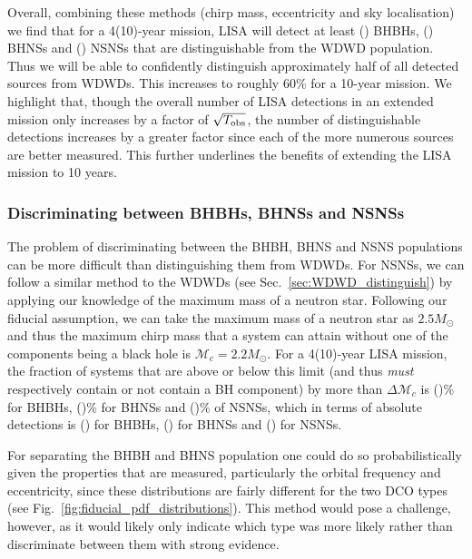 Overall, combining these methods (chirp mass, eccentricity and sky localisation) we find that for a 4(10)-year mission, LISA will detect at least \BHBHNotWDWDFour{}(\BHBHNotWDWDTen{}) BHBHs, \BHNSNotWDWDFour{}(\BHNSNotWDWDTen{}) BHNSs and \NSNSNotWDWDFour{}(\NSNSNotWDWDTen{}) NSNSs that are distinguishable from the WDWD population. Thus we will be able to confidently distinguish approximately half of all detected sources from WDWDs. This increases to roughly 60\% for a 10-year mission. We highlight that, though the overall number of LISA detections in an extended mission only increases by a factor of $\sqrt{T_{\rm obs}}$, the number of distinguishable detections increases by a greater factor since each of the more numerous sources are better measured. This further underlines the benefits of extending the LISA mission to 10 years.

\subsubsection{Discriminating between BHBHs, BHNSs and NSNSs}

The problem of discriminating between the BHBH, BHNS and NSNS populations can be more difficult than distinguishing them from WDWDs. For NSNSs, we can follow a similar method to the WDWDs (see Sec.~\ref{sec:WDWD_distinguish}) by applying our knowledge of the maximum mass of a neutron star. Following our fiducial assumption, we can take the maximum mass of a neutron star as $2.5 \unit{M_{\odot}}$ and thus the maximum chirp mass that a system can attain without one of the components being a black hole is $\mathcal{M}_{c} = 2.2 \unit{M_\odot}$. For a 4(10)-year LISA mission, the fraction of systems that are above or below this limit (and thus \textit{must} respectively contain or not contain a BH component) by more than $\Delta \mathcal{M}_c$ is \BHBHEitherBHOrNSFourPerc{}(\BHBHEitherBHOrNSTenPerc{})\% for BHBHs, \BHNSEitherBHOrNSFourPerc{}(\BHNSEitherBHOrNSTenPerc{})\% for BHNSs and \NSNSEitherBHOrNSFourPerc{}(\NSNSEitherBHOrNSTenPerc{})\% of NSNSs, which in terms of absolute detections is \BHBHEitherBHOrNSFour{}(\BHBHEitherBHOrNSTen{}) for BHBHs, \BHNSEitherBHOrNSFour{}(\BHNSEitherBHOrNSTen{}) for BHNSs and \NSNSEitherBHOrNSFour{}(\NSNSEitherBHOrNSTen{}) for NSNSs.

For separating the BHBH and BHNS population one could do so probabilistically given the properties that are measured, particularly the orbital frequency and eccentricity, since these distributions are fairly different for the two DCO types (see Fig.~\ref{fig:fiducial_pdf_distributions}). This method would pose a challenge, however, as it would likely only indicate which type was more likely rather than discriminate between them with strong evidence.


